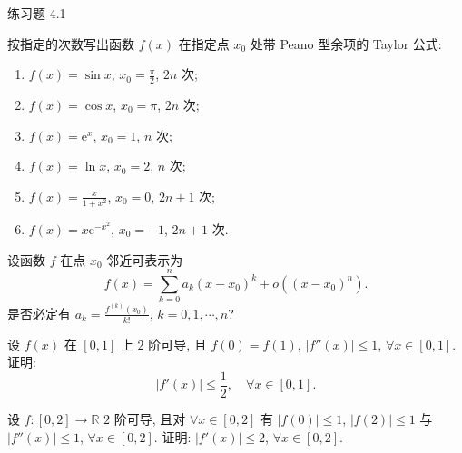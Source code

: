 \begin{exblock}{练习题 4.1}
  \item 按指定的次数写出函数 $f(x)$ 在指定点 $x_{0}$ 处带 Peano 型余项的 Taylor 公式:
  \begin{enumerate}[label=(\arabic*)]
    \item $f(x)=\sin x$, $x_{0}=\frac{\pi}{2}$, $2n$ 次;
    \item $f(x)=\cos x$, $x_{0}=\pi$, $2n$ 次;
    \item $f(x)=\mathrm{e}^{x}$, $x_{0}=1$, $n$ 次;
    \item $f(x)=\ln x$, $x_{0}=2$, $n$ 次;
    \item $f(x)=\frac{x}{1+x^{2}}$, $x_{0}=0$, $2n+1$ 次;
    \item $f(x)=x\mathrm{e}^{-x^{2}}$, $x_{0}=-1$, $2n+1$ 次.
  \end{enumerate}

  \item 设函数 $f$ 在点 $x_{0}$ 邻近可表示为
  \[
  f(x)=\sum_{k=0}^{n}a_{k}(x-x_{0})^{k}+o((x-x_{0})^{n}).
\]
  是否必定有 $a_{k}=\frac{f^{(k)}(x_{0})}{k!}$, $k=0,1,\cdots,n$?

  \item 设 $f(x)$ 在 $[0,1]$ 上 $2$ 阶可导, 且 $f(0)=f(1)$, $|f''(x)|\leqslant 1$, $\forall x\in[0,1]$. 证明:
  \[
  |f'(x)|\leqslant\frac{1}{2},\quad \forall x\in[0,1].
\]

  \item 设 $f:[0,2]\to\mathbb{R}$ $2$ 阶可导, 且对 $\forall x\in[0,2]$ 有 $|f(0)|\leqslant 1$, $|f(2)|\leqslant 1$ 与 $|f''(x)|\leqslant 1$, $\forall x\in[0,2]$. 证明: $|f'(x)|\leqslant 2$, $\forall x\in[0,2]$.
\end{exblock}

